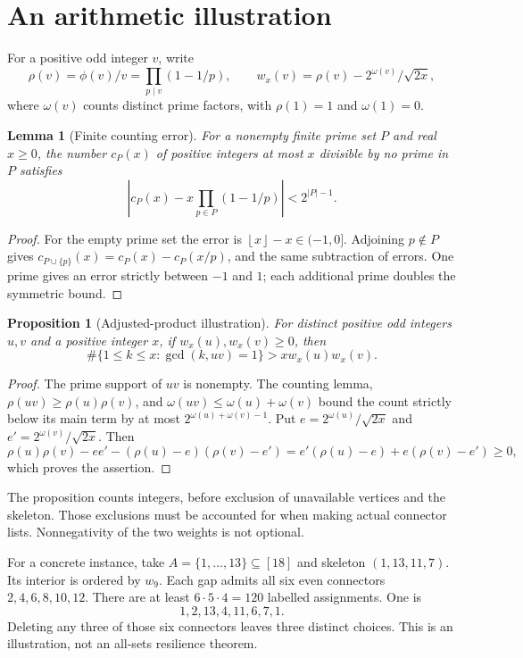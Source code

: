 \documentclass[11pt,letterpaper]{article}
\newtheorem{lemma}[theorem]{Lemma}
\newtheorem{proposition}[theorem]{Proposition}
\theoremstyle{remark}\newtheorem{remark}[theorem]{Remark}
\newcommand{\floor}[1]{\left\lfloor#1\right\rfloor}
\begin{document}
\section{An arithmetic illustration}
For a positive odd integer $v$, write
\[
 \rho(v)=\phi(v)/v=\prod_{p\mid v}(1-1/p),\qquad
 w_x(v)=\rho(v)-2^{\omega(v)}/\sqrt{2x},
\]
where $\omega(v)$ counts distinct prime factors, with $\rho(1)=1$ and $\omega(1)=0$.
\begin{lemma}[Finite counting error]
For a nonempty finite prime set $P$ and real $x\ge0$, the number $c_P(x)$ of positive integers at most $x$ divisible by no prime in $P$ satisfies
\[
 \left|c_P(x)-x\prod_{p\in P}(1-1/p)\right|<2^{|P|-1}.
\]
\end{lemma}
\begin{proof}
For the empty prime set the error is $\floor{x}-x\in(-1,0]$. Adjoining $p\notin P$ gives $c_{P\cup\{p\}}(x)=c_P(x)-c_P(x/p)$, and the same subtraction of errors. One prime gives an error strictly between $-1$ and $1$; each additional prime doubles the symmetric bound.
\end{proof}
\begin{proposition}[Adjusted-product illustration]
For distinct positive odd integers $u,v$ and a positive integer $x$, if $w_x(u),w_x(v)\ge0$, then
\[
 \#\{1\le k\le x:\gcd(k,uv)=1\}>xw_x(u)w_x(v).
\]
\end{proposition}
\begin{proof}
The prime support of $uv$ is nonempty. The counting lemma, $\rho(uv)\ge\rho(u)\rho(v)$, and $\omega(uv)\le\omega(u)+\omega(v)$ bound the count strictly below its main term by at most $2^{\omega(u)+\omega(v)-1}$. Put $e=2^{\omega(u)}/\sqrt{2x}$ and $e'=2^{\omega(v)}/\sqrt{2x}$. Then
\[
 \rho(u)\rho(v)-ee'-(\rho(u)-e)(\rho(v)-e')
 =e'(\rho(u)-e)+e(\rho(v)-e')\ge0,
\]
which proves the assertion.
\end{proof}
The proposition counts integers, before exclusion of unavailable vertices and the skeleton. Those exclusions must be accounted for when making actual connector lists. Nonnegativity of the two weights is not optional.

For a concrete instance, take $A=\{1,\ldots,13\}\subseteq[18]$ and skeleton $(1,13,11,7)$. Its interior is ordered by $w_9$. Each gap admits all six even connectors $2,4,6,8,10,12$. There are at least $6\cdot5\cdot4=120$ labelled assignments. One is
\[
 1,2,13,4,11,6,7,1.
\]
Deleting any three of those six connectors leaves three distinct choices. This is an illustration, not an all-sets resilience theorem.
\end{document}
